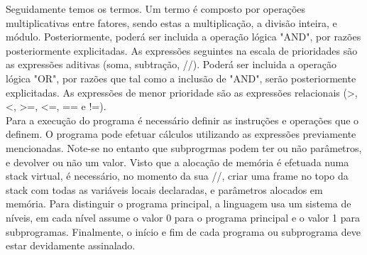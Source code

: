 Seguidamente temos os termos. Um termo é composto por operações multiplicativas entre fatores, sendo estas a multiplicação, a divisão inteira, e módulo. Posteriormente, poderá ser incluida a operação lógica "AND", por razões posteriormente explicitadas. As expressões seguintes na escala de prioridades são as expressões aditivas (soma, subtração, //). Poderá ser incluida a operação lógica "OR", por razões que tal como a inclusão de "AND", serão posteriormente explicitadas. As expressões de menor prioridade são as expressões relacionais (>, <, >=, <=, == e !=).\\

Para a execução do programa é necessário definir as instruções e operações que o definem. O programa pode efetuar cálculos utilizando as expressões previamente mencionadas. Note-se no entanto que subprogrmas podem ter ou não parâmetros, e devolver ou não um valor. Visto que a alocação de memória é efetuada numa stack virtual, é necessário, no momento da sua //, criar uma frame no topo da stack com todas as variáveis locais declaradas, e parâmetros alocados em memória. Para distinguir o programa principal, a linguagem usa um sistema de níveis, em cada nível assume o valor 0 para o programa principal e o valor 1 para subprogramas. Finalmente, o início e fim de cada programa ou subprograma deve estar devidamente assinalado.  

   




 



